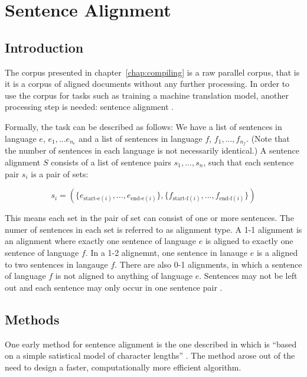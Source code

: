 \chapter{Sentence Alignment}

\section{Introduction}

The corpus presented in chapter~\ref{chap:compiling} is a raw parallel corpus, that is it is a corpus of aligned documents without any further processing. 
In order to use the corpus for tasks such as training a machine translation model, another processing step is needed: sentence alignment \autocite[55]{koehn2009}.

Formally, the task can be described as follows: We have a list of sentences in language \(e\), \(e_1,...e_{n_e}\) and a list of sentences in language \(f\), \(f_1,...,f_{n_f}\). 
(Note that the number of sentences in each language is not necessarily identical.) 
A sentence alignment \(S\) consists of a list of sentence pairs \(s_1, ..., s_n\), such that each sentence pair \(s_i\) is a pair of sets:

\[
	s_i = ( \{ e_{\text{start-e}(i)},... , e_{\text{end-e}(i)}\}, \{f_{\text{start-f}(i)},... , f_{\text{end-f}(i)}\} )
\]
\autocite[56]{koehn2009}

This means each set in the pair of set can consist of one or more sentences. 
The numer of sentences in each set is referred to as alignment type. 
A 1-1 alignment is an alignment where exactly one sentence of language \(e\)
is aligned to exactly one sentence of language \(f\). 
In a 1-2 alignemnt, one sentence in lanauge \(e\) is a aligned to two sentences in langauge \(f\). 
There are also 0-1 alignments, in which a sentence of language \(f\) is not aligned to anything of language \(e\). 
Sentences may not be left out and each sentence may only occur in one sentence pair \autocite[57]{koehn2009}. 


\section{Methods}
One early method for sentence alignment is the one described in \cite{gale-church-1991-program} which is \enquote{based on a simple satistical model of character lengths} \autocite{gale-church-1991-program}. The method arose out of the need to design a faster, computationally more efficient algorithm\footnotemark.

